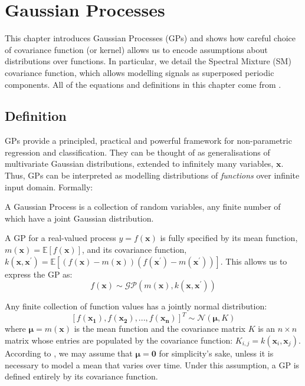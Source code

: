 \chapter{Gaussian Processes}{\label{ch:Gaussian Processes}}
This chapter introduces Gaussian Processes (GPs) and shows how careful choice of covariance function (or kernel) allows us to encode assumptions about distributions over functions. In particular, we detail the Spectral Mixture (SM) covariance function, which allows modelling signals as superposed periodic components. All of the equations and definitions in this chapter come from \cite{rasmussen_2006_gaussian}. 

\section{Definition}
GPs provide a principled, practical and powerful framework for non-parametric regression and classification. They can be thought of as generalisations of multivariate Gaussian distributions, extended to infinitely many variables, $\boldsymbol{x}$. Thus, GPs can be interpreted as modelling distributions of \textit{functions} over infinite input domain. Formally:

\begin{definition}
    A Gaussian Process is a collection of random variables, any finite number of which have a joint Gaussian distribution.
\end{definition}

A GP for a real-valued process $y = f(\boldsymbol{x})$ is fully specified by its mean function, $m(\boldsymbol{x}) = \mathbb{E}[f(\boldsymbol{x})]$, and its covariance function, $k(\boldsymbol{x}, \boldsymbol{x}^\prime) =  \mathbb{E}[(f(\boldsymbol{x}) - m(\boldsymbol{x}))(f(\boldsymbol{x}^\prime) - m(\boldsymbol{x}^\prime))]$. This allows us to express the GP as:
\[
f(\boldsymbol{x}) \sim \mathcal{GP}(m(\boldsymbol{x}), k(\boldsymbol{x},\boldsymbol{x}^\prime))
\]

Any finite collection of function values has a jointly normal distribution: 
\[
[f(\boldsymbol{x_1}), f(\boldsymbol{x_2}), ..., f(\boldsymbol{x_n})]^T \sim \mathcal{N}(\boldsymbol{\mu}, K)
\]
where $\boldsymbol{\mu} = m(\boldsymbol{x})$ is the mean function and the covariance matrix $K$ is an $n \times n$ matrix whose entries are populated by the covariance function: $K_{i,j} = k(\boldsymbol{x}_i, \boldsymbol{x}_j)$. According to \cite{rasmussen_2006_gaussian}, we may assume that $\boldsymbol \mu = \boldsymbol 0$ for simplicity's sake, unless it is necessary to model a mean that varies over time. Under this assumption, a GP is defined entirely by its covariance function.\\

